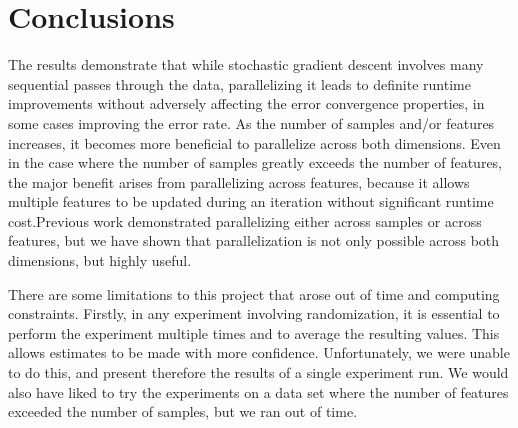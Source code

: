 \documentclass{article}
\begin{document}



\section{Conclusions}
The results demonstrate that while stochastic gradient descent involves many sequential passes through the data, parallelizing it leads to definite runtime improvements without adversely affecting the error convergence properties, in some cases improving the error rate.  As the number of samples and/or features increases, it becomes more beneficial to parallelize across both dimensions.  Even in the case where the number of samples greatly exceeds the number of features, the major benefit arises from parallelizing across features, because it allows multiple features to be updated during an iteration without significant runtime cost.Previous work demonstrated parallelizing either across samples or across features, but we have shown that parallelization is not only possible across both dimensions, but highly useful.

There are some limitations to this project that arose out of time and computing constraints. Firstly, in any experiment involving randomization, it is essential to perform the experiment multiple times and to average the resulting values. This allows estimates to be made with more confidence. Unfortunately, we were unable to do this, and present therefore the results of a single experiment run.  We would also have liked to try the experiments on a data set where the number of features exceeded the number of samples, but we ran out of time.



\end{document}
